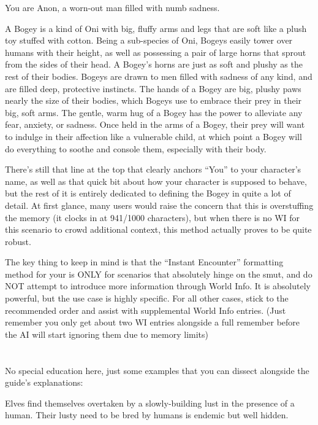 \documentclass[Coomer-main.tex]{subfiles}
\begin{document}
\begin{/rm}
You are Anon, a worn-out man filled with numb sadness.
\bigskip

A Bogey is a kind of Oni with big, fluffy arms and legs that are soft like a plush toy stuffed with cotton.
Being a sub-species of Oni, Bogeys easily tower over humans with their height, as well as possessing a pair of large horns that sprout from the sides of their head.
A Bogey's horns are just as soft and plushy as the rest of their bodies.
Bogeys are drawn to men filled with sadness of any kind, and are filled deep, protective instincts.
The hands of a Bogey are big, plushy paws nearly the size of their bodies, which Bogeys use to embrace their prey in their big, soft arms.
The gentle, warm hug of a Bogey has the power to alleviate any fear, anxiety, or sadness.
Once held in the arms of a Bogey, their prey will want to indulge in their affection like a vulnerable child, at which point a Bogey will do everything to soothe and console them, especially with their body.
\end{/rm}

There’s still that line at the top that clearly anchors “You” to your character’s name, as well as that quick bit about how your character is supposed to behave, but the rest of it is entirely dedicated to defining the Bogey in quite a lot of detail.
At first glance, many users would raise the concern that this is overstuffing the memory (it clocks in at 941/1000 characters), but when there is no WI for this scenario to crowd additional context, this method actually proves to be quite robust.

The key thing to keep in mind is that the “Instant Encounter” formatting method for your \rem is ONLY for scenarios that absolutely hinge on the smut, and do NOT attempt to introduce more information through World Info.
It is absolutely powerful, but the use case is highly specific.
For all other cases, stick to the recommended order and assist with supplemental World Info entries. (Just remember you only get about two WI entries alongside a full remember before the AI will start ignoring them due to memory limits)

\section{\ans}

No special education here, just some examples that you can dissect alongside the guide’s explanations:

\begin{/an}
Elves find themselves overtaken by a slowly-building lust in the presence of a human.
Their lusty need to be bred by humans is endemic but well hidden.
\end{/an}
\end{document}
